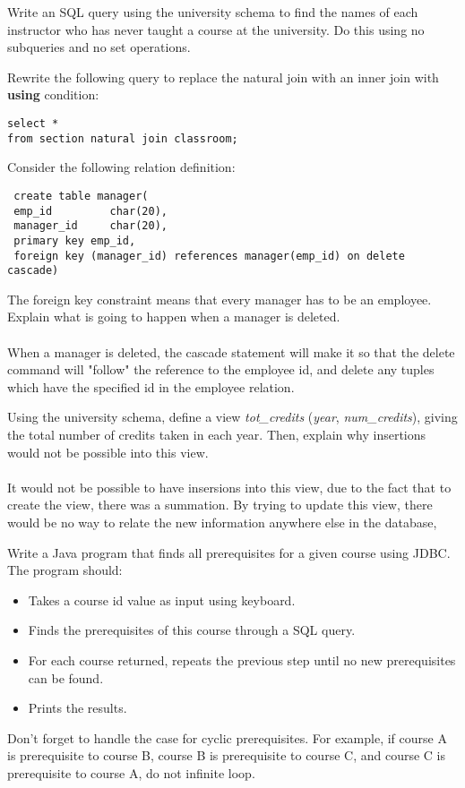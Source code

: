 \documentclass[a4 paper]{article}
\begin{document}
Write an SQL query using the university schema to find the names of each instructor who has never taught a course at the university. Do this using no subqueries and no set operations.


Rewrite the following query to replace the natural join with an inner join with \textbf{using} condition:
\begin{verbatim}
select *
from section natural join classroom;
\end{verbatim}



\color{black}

Consider the following relation definition:
\begin{verbatim}
 create table manager(
 emp_id         char(20),
 manager_id     char(20),
 primary key emp_id,
 foreign key (manager_id) references manager(emp_id) on delete cascade)
\end{verbatim}
The foreign key constraint means that every manager has to be an employee.
Explain what is going to happen when a manager is deleted.\\\\
When a manager is deleted, the cascade statement will make it so that the delete command will "follow" the reference to the employee id, and delete any tuples which have the specified id in the employee relation.



Using the university schema, define a view \emph{tot\_credits} (\emph{year}, \emph{num\_credits}), giving the total number of credits taken in each year. Then, explain why insertions would not be possible into this view.\\\\

It would not be possible to have insersions into this view, due to the fact that to create the view, there was a summation. By trying to update this view, there would be no way to relate the new information anywhere else in the database,




Write a Java program that finds all prerequisites for a given course using JDBC. The program should:
\begin{itemize}
 \item Takes a course id value as input using keyboard.
 \item Finds the prerequisites of this course through a SQL query.
 \item For each course returned, repeats the previous step until no new prerequisites can be found.
 \item Prints the results.
\end{itemize}
Don't forget to handle the case for cyclic prerequisites. For example, if course A is prerequisite to course B, course B is prerequisite to course C, and course C is prerequisite to course A, do not infinite loop.
\end{document}
